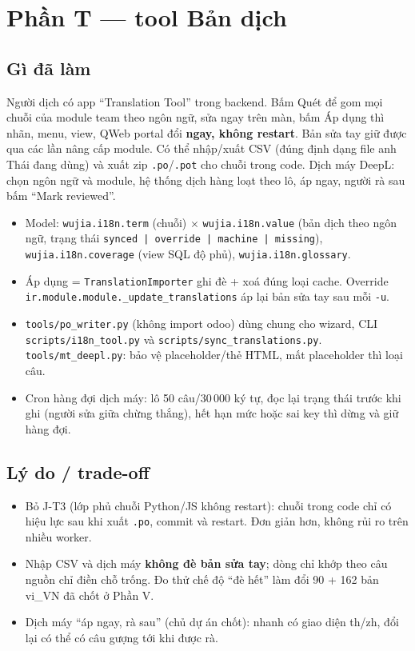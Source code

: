 \section{Phần T --- tool Bản dịch}

\subsection*{Gì đã làm}
Người dịch có app ``Translation Tool'' trong backend. Bấm Quét để gom mọi chuỗi của module team theo ngôn ngữ, sửa ngay trên màn,
bấm Áp dụng thì nhãn, menu, view, QWeb portal đổi \textbf{ngay, không restart}. Bản sửa tay giữ được qua các lần nâng cấp module.
Có thể nhập/xuất CSV (đúng định dạng file anh Thái đang dùng) và xuất zip \texttt{.po}/\texttt{.pot} cho chuỗi trong code. Dịch máy
DeepL: chọn ngôn ngữ và module, hệ thống dịch hàng loạt theo lô, áp ngay, người rà sau bấm ``Mark reviewed''.

\begin{itemize}[nosep]
\item Model: \texttt{wujia.i18n.term} (chuỗi) $\times$ \texttt{wujia.i18n.value} (bản dịch theo ngôn ngữ, trạng thái
  \texttt{synced | override | machine | missing}), \texttt{wujia.i18n.coverage} (view SQL độ phủ), \texttt{wujia.i18n.glossary}.
\item Áp dụng = \texttt{TranslationImporter} ghi đè + xoá đúng loại cache. Override \texttt{ir.module.module.\_update\_translations}
  áp lại bản sửa tay sau mỗi \texttt{-u}.
\item \texttt{tools/po\_writer.py} (không import odoo) dùng chung cho wizard, CLI \texttt{scripts/i18n\_tool.py} và
  \texttt{scripts/sync\_translations.py}. \texttt{tools/mt\_deepl.py}: bảo vệ placeholder/thẻ HTML, mất placeholder thì loại câu.
\item Cron hàng đợi dịch máy: lô 50 câu/30\,000 ký tự, đọc lại trạng thái trước khi ghi (người sửa giữa chừng thắng), hết hạn mức
  hoặc sai key thì dừng và giữ hàng đợi.
\end{itemize}

\subsection*{Lý do / trade-off}
\begin{itemize}[nosep]
\item Bỏ J-T3 (lớp phủ chuỗi Python/JS không restart): chuỗi trong code chỉ có hiệu lực sau khi xuất \texttt{.po}, commit và restart.
  Đơn giản hơn, không rủi ro trên nhiều worker.
\item Nhập CSV và dịch máy \textbf{không đè bản sửa tay}; dòng chỉ khớp theo câu nguồn chỉ điền chỗ trống. Đo thử chế độ ``đè hết''
  làm đổi 90 + 162 bản vi\_VN đã chốt ở Phần V.
\item Dịch máy ``áp ngay, rà sau'' (chủ dự án chốt): nhanh có giao diện th/zh, đổi lại có thể có câu gượng tới khi được rà.
\end{itemize}

